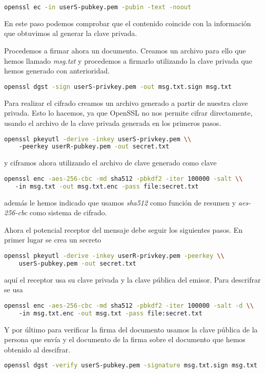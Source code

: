 \documentclass{article}
\begin{document}
\begin{lstlisting}[language=bash]
  openssl ec -in userS-pubkey.pem -pubin -text -noout
\end{lstlisting}

En este paso podemos comprobar  que el contenido coincide con la información que
obtuvimos al generar la clave privada.

Procedemos a firmar ahora un documento. Creamos un archivo para ello que hemos
llamado \textit{msg.txt} y procedemos a firmarlo utilizando la clave privada que
hemos generado con anterioridad.

\begin{lstlisting}[language=bash]
  openssl dgst -sign userS-privkey.pem -out msg.txt.sign msg.txt
\end{lstlisting}

Para realizar el cifrado creamos un archivo generado a partir de nuestra clave
privada. Esto lo hacemos, ya que OpenSSL no nos permite cifrar directamente,
usando el archivo de la clave privada generada en los primeros pasos.

\begin{lstlisting}[language=bash]
  openssl pkeyutl -derive -inkey userS-privkey.pem \\
    -peerkey userR-pubkey.pem -out secret.txt
\end{lstlisting}

y ciframos ahora utilizando el archivo de clave generado como clave

\begin{lstlisting}[language=bash]
  openssl enc -aes-256-cbc -md sha512 -pbkdf2 -iter 100000 -salt \\
   -in msg.txt -out msg.txt.enc -pass file:secret.txt
\end{lstlisting}

además le hemos indicado que usamos \textit{sha512} como función de resumen y
\textit{aes-256-cbc} como sistema de cifrado.

Ahora el potencial receptor del mensaje debe seguir los siguientes pasos. En
primer lugar se crea un secreto 

\begin{lstlisting}[language=bash]
  openssl pkeyutl -derive -inkey userR-privkey.pem -peerkey \\
    userS-pubkey.pem -out secret.txt
\end{lstlisting}

aquí el receptor usa su clave privada y la clave pública del emisor. Para
descrifrar se usa

\begin{lstlisting}[language=bash]
  openssl enc -aes-256-cbc -md sha512 -pbkdf2 -iter 100000 -salt -d \\
    -in msg.txt.enc -out msg.txt -pass file:secret.txt
\end{lstlisting}

Y por último para verificar la firma del documento usamos la clave pública de la
persona que envía y el documento de la firma sobre el documento que hemos
obtenido al descifrar.

\begin{lstlisting}[language=bash]
  openssl dgst -verify userS-pubkey.pem -signature msg.txt.sign msg.txt
\end{lstlisting}
\end{document}
